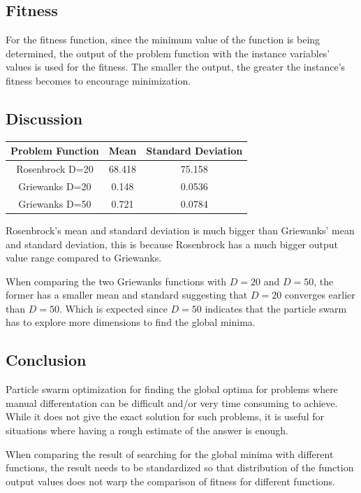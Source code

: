 \documentclass{article}
\begin{document}
\subsection*{Fitness}
For the fitness function, since the minimum value of the function is being determined, the output of the problem function with the instance variables' values is used for the fitness. The smaller the output, the greater the instance’s fitness becomes to encourage minimization. \par
\subsection*{Discussion}
\begin{center}
\begin{tabular}{|c|c|c|}
\hline
Problem Function & Mean & Standard Deviation \\
\hline
Rosenbrock D=20 & 68.418 & 75.158 \\
\hline
Griewanks D=20 & 0.148 & 0.0536 \\
\hline
Griewanks D=50 & 0.721 & 0.0784 \\
\hline
\end{tabular}
\end{center}
Rosenbrock's mean and standard deviation is much bigger than Griewanks' mean and standard deviation, this is because Rosenbrock has a much bigger output value range compared to Griewanks. \par 
\noindent When comparing the two Griewanks functions with $D = 20$ and $D = 50$, the former has a smaller mean and standard suggesting that $D = 20$ converges earlier than $D = 50$. Which is expected since $D = 50$ indicates that the particle swarm has to explore more dimensions to find the global minima. \par
\subsection*{Conclusion}
Particle swarm optimization for finding the global optima for problems where manual differentation can be difficult and/or very time consuming to achieve. While it does not give the exact solution for such problems, it is useful for situations where having a rough estimate of the answer is enough. \par
\noindent When comparing the result of searching for the global minima with different functions, the result needs to be standardized so that distribution of the function output values does not warp the comparison of fitness for different functions. \par
\end{document}
